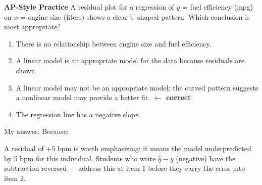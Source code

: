 \documentclass[10pt]{article}
\begin{document}
\begin{tcolorbox}[colback=redbg, colframe=redacc, boxrule=0.8pt, arc=2mm,
    left=4mm, right=4mm, top=2.5mm, bottom=2.5mm]
\small\textbf{AP-Style Practice}\enspace
A residual plot for a regression of $y$ = fuel efficiency (mpg) on $x$ = engine size (liters)
shows a clear U-shaped pattern. Which conclusion is most appropriate?

\vspace{7pt}
\begin{enumerate}[label=\textbf{(\Alph*)}, leftmargin=2em, itemsep=4pt]
  \item There is no relationship between engine size and fuel efficiency.
  \item A linear model is an appropriate model for the data because residuals are shown.
  \item A linear model may not be an appropriate model; the curved pattern suggests a
        nonlinear model may provide a better fit.
        \textcolor{keyred}{\textbf{$\leftarrow$ correct}}
  \item The regression line has a negative slope.
\end{enumerate}
\end{tcolorbox}

\vspace{0.08in}
\noindent\textcolor{slate}{\small My answer:  \quad Because:
}

\begin{teachernote}
A residual of $+5$ bpm is worth emphasizing: it means the model underpredicted by 5 bpm for
this individual. Students who write $\hat{y} - y$ (negative) have the subtraction reversed
--- address this at item 1 before they carry the error into item 2.
\end{teachernote}
\end{document}
